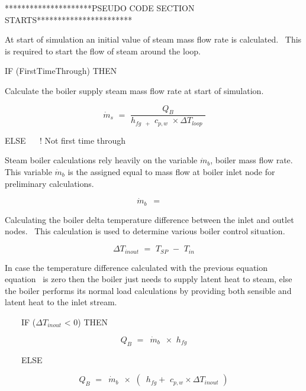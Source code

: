 *********************PSEUDO CODE SECTION STARTS***********************

At start of simulation an initial value of steam mass flow rate is calculated.~ This is required to start the flow of steam around the loop.

IF (FirstTimeThrough) THEN

Calculate the boiler supply steam mass flow rate at start of simulation.

\begin{equation}
\,{\dot m_s}\,\, = \,\,\frac{{{Q_B}}}{{{h_{fg\,\,\, + }}\,\,{c_{p,w}}\,\, \times \Delta {T_{loop}}\,\,}}
\end{equation}

ELSE ~~ ! Not first time through

Steam boiler calculations rely heavily on the variable \(\dot m\)\(_{b}\), boiler mass flow rate.~ This variable \(\dot m_{b}\) is the assigned equal to mass flow at boiler inlet node for preliminary calculations.

\begin{equation}
\,{\dot m_b}\,\,\, = \,\,\,\mathop {\,{{\dot m}_{InletNode}}}\limits^{}
\end{equation}

Calculating the boiler delta temperature difference between the inlet and outlet nodes.~ This calculation is used to determine various boiler control situation.

\begin{equation}
\Delta {T_{inout}}\,\, = \,\,{T_{SP}}\,\, - \,\,{T_{in}}
\end{equation}

In case the temperature difference calculated with the previous equation equation~ is zero then the boiler just needs to supply latent heat to steam, else the boiler performs its normal load calculations by providing both sensible and latent heat to the inlet stream.

~~~~IF (\(\Delta {T_{inout}}\) < 0) THEN

\begin{equation}
{Q_B}\,\, = \,\,\,{\dot m_b}\,\,\, \times \,\,{h_{fg}}
\end{equation}

~~~~ELSE

\begin{equation}
{Q_B}\,\, = \,\,\,{\dot m_b}\,\,\, \times \,\,(\,\,\,{h_{fg}} + \,\,{c_{p,w}} \times \Delta {T_{inout}}\,\,)
\end{equation}

